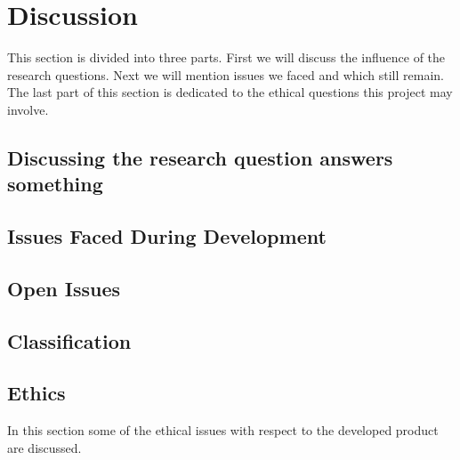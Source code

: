 \chapter{Discussion}

This section is divided into three parts. First we will discuss the influence of the research questions. Next we will mention issues we faced and which still remain. The last part of this section is dedicated to the ethical questions this project may involve.

\section{Discussing the research question answers something} 

\section{Issues Faced During Development}
    


\section{Open Issues}\label{sec:Discussion - Open Issues}

\section{Classification}

\section{Ethics}
In this section some of the ethical issues with respect to the developed product are discussed. 

